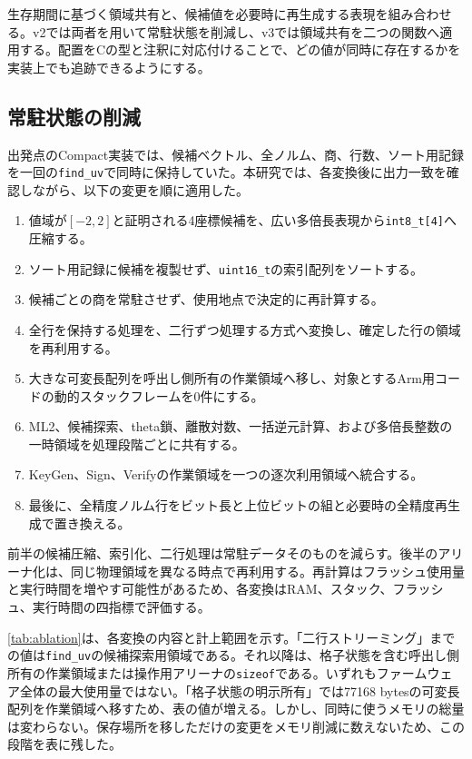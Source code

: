 \documentclass[a4paper,10pt]{ltjsarticle}
\theoremstyle{definition}
\theoremstyle{remark}
\begin{document}
生存期間に基づく領域共有と、候補値を必要時に再生成する表現を組み合わせる。v2では両者を用いて常駐状態を削減し、v3では領域共有を二つの関数へ適用する。配置をCの型と注釈に対応付けることで、どの値が同時に存在するかを実装上でも追跡できるようにする。

\subsection{常駐状態の削減}

出発点のCompact実装では、候補ベクトル、全ノルム、商、行数、ソート用記録を一回の\texttt{find\_uv}で同時に保持していた。本研究では、各変換後に出力一致を確認しながら、以下の変更を順に適用した。

\begin{enumerate}[leftmargin=2.2em]
  \item 値域が$[-2,2]$と証明される4座標候補を、広い多倍長表現から\texttt{int8\_t[4]}へ圧縮する。
  \item ソート用記録に候補を複製せず、\texttt{uint16\_t}の索引配列をソートする。
  \item 候補ごとの商を常駐させず、使用地点で決定的に再計算する。
  \item 全行を保持する処理を、二行ずつ処理する方式へ変換し、確定した行の領域を再利用する。
  \item 大きな可変長配列を呼出し側所有の作業領域へ移し、対象とするArm用コードの動的スタックフレームを0件にする。
  \item ML2、候補探索、theta鎖、離散対数、一括逆元計算、および多倍長整数の一時領域を処理段階ごとに共有する。
  \item KeyGen、Sign、Verifyの作業領域を一つの逐次利用領域へ統合する。
  \item 最後に、全精度ノルム行をビット長と上位ビットの組と必要時の全精度再生成で置き換える。
\end{enumerate}

前半の候補圧縮、索引化、二行処理は常駐データそのものを減らす。後半のアリーナ化は、同じ物理領域を異なる時点で再利用する。再計算はフラッシュ使用量と実行時間を増やす可能性があるため、各変換はRAM、スタック、フラッシュ、実行時間の四指標で評価する。

\cref{tab:ablation}は、各変換の内容と計上範囲を示す。「二行ストリーミング」までの値は\texttt{find\_uv}の候補探索用領域である。それ以降は、格子状態を含む呼出し側所有の作業領域または操作用アリーナの\texttt{sizeof}である。いずれもファームウェア全体の最大使用量ではない。「格子状態の明示所有」では\num{77168} bytesの可変長配列を作業領域へ移すため、表の値が増える。しかし、同時に使うメモリの総量は変わらない。保存場所を移しただけの変更をメモリ削減に数えないため、この段階を表に残した。
\end{document}
